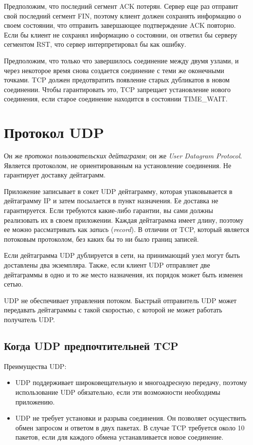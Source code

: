 Предположим, что последний сегмент ACK потерян. Сервер еще раз отправит свой последний сегмент FIN, поэтому клиент должен сохранять информацию о своем состоянии, что отправить завершающее подтверждение ACK повторно. Если бы клиент не сохранял информацию о состоянии, он ответил бы серверу сегментом RST, что сервер интерпретировал бы как ошибку.

Предположим, что только что завершилось соединение между двумя узлами, и через некоторое время снова создается соединение с теми же оконечными точками. TCP должен предотвратить появление старых дубликатов в новом соединении. Чтобы гарантировать это, TCP запрещает установление нового соединения, если старое соединение находится в состоянии TIME\_WAIT.

\section{Протокол UDP}
\label{sec:udp}
Он же \emph{протокол пользовательских дейтаграмм}; он же \emph{User Datagram Protocol}. Является протоколом, не ориентированным на установление соединения. Не гарантирует доставку дейтаграмм.

Приложение записывает в сокет UDP дейтаграмму, которая упаковывается в дейтаграмму IP и затем посылается в пункт назначения. Ее доставка не гарантируется. Если требуются какие-либо гарантии, вы сами должны реализовать их в своем приложении. Каждая дейтаграмма имеет длину, поэтому ее можно рассматривать как \emph{запись} (\emph{record}). В отличии от TCP, который является потоковым протоколом, без каких бы то ни было границ записей.

Если дейтаграмма UDP дублируется в сети, на принимающий узел могут быть доставлены два экземпляра. Также, если клиент UDP отправляет две дейтаграммы в одно и то же место назначения, их порядок может быть изменен сетью.

UDP не обеспечивает управления потоком. Быстрый отправитель UDP может передавать дейтаграммы с такой скоростью, с которой не может работать получатель UDP.

\subsection{Когда UDP предпочтительней TCP}
Преимущества UDP:

\begin{itemize}
  \item UDP поддерживает широковещательную и многоадресную передачу, поэтому использование UDP обязательно, если эти возможности необходимы приложению.
  \item UDP не требует установки и разрыва соединения. Он позволяет осуществить обмен запросом и ответом в двух пакетах. В случае TCP требуется около 10 пакетов, если для каждого обмена устанавливается новое соединение.
\end{itemize}

